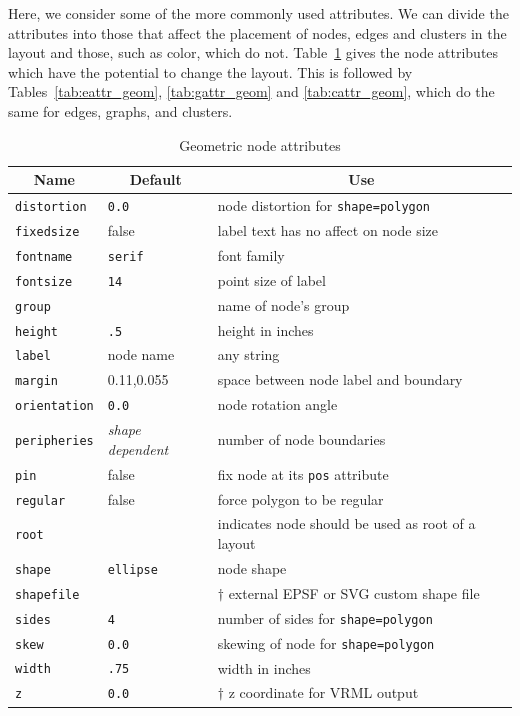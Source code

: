 Here, we consider some of the more commonly used attributes.
We can divide the attributes into those that affect the placement
of nodes, edges and clusters in the layout and those, such as color, 
which do not. 
Table~\ref{tab:nattr_geom} gives the node attributes which have the potential
to change the layout. This is followed by Tables~\ref{tab:eattr_geom},
\ref{tab:gattr_geom} and \ref{tab:cattr_geom}, which do the same for 
edges, graphs, and clusters.
\begin{table}[htbp]\footnotesize
\centering
\begin{tabular}[t]{|l|l|p{2.5in}|} \hline
\multicolumn{1}{|c|}{Name} & \multicolumn{1}{c|}{Default} & \multicolumn{1}{c|}{Use} \\ \hline
{\tt distortion} & {\tt 0.0} & node distortion for {\tt shape=polygon} \\
{\tt fixedsize} & false & label text has no affect on node size \\
{\tt fontname} & {\tt serif} & font family \\
{\tt fontsize} & {\tt 14} & point size of label \\
{\tt group} &  & name of node's group \\
{\tt height} & {\tt .5} & height in inches \\
{\tt label} & node name & any string \\
{\tt margin} &  0.11,0.055 & space between node label and boundary \\
{\tt orientation} & {\tt 0.0} & node rotation angle \\
{\tt peripheries} & {\em shape dependent} & number of node boundaries \\
{\tt pin} & false & fix node at its {\tt pos} attribute \\
{\tt regular} & false & force polygon to be regular \\
{\tt root} & & indicates node should be used as root of a layout \\
{\tt shape} & {\tt ellipse} & node shape \\
{\tt shapefile} & & $\dagger$ external EPSF or SVG custom shape file\\
{\tt sides} & {\tt 4} & number of sides for {\tt shape=polygon} \\
{\tt skew} & {\tt 0.0} & skewing of node for {\tt shape=polygon} \\
{\tt width} & {\tt .75} & width in inches \\
{\tt z} & {\tt 0.0} & $\dagger$ z coordinate for VRML output \\
\hline
\end{tabular}
\caption{Geometric node attributes}
\label{tab:nattr_geom}
\end{table}
